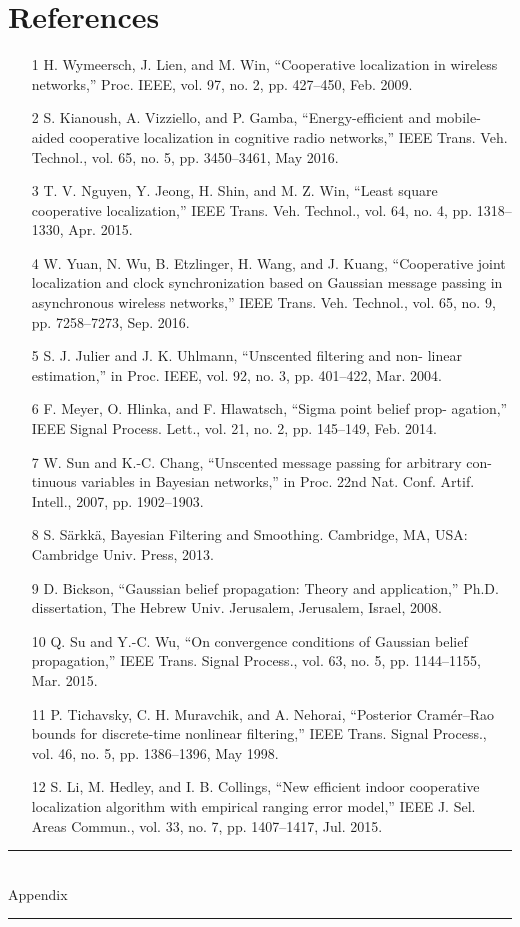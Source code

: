 \documentclass[12pt]{article}
\begin{document}
\section{References}
	\begin{itemize}
		\item[1] H. Wymeersch, J. Lien, and M. Win, “Cooperative localization in wireless
networks,” Proc. IEEE, vol. 97, no. 2, pp. 427–450, Feb. 2009.
		\item[2] S. Kianoush, A. Vizziello, and P. Gamba, “Energy-efficient and mobile-
aided cooperative localization in cognitive radio networks,” IEEE Trans.
Veh. Technol., vol. 65, no. 5, pp. 3450–3461, May 2016.
		\item[3] T. V. Nguyen, Y. Jeong, H. Shin, and M. Z. Win, “Least square cooperative
localization,” IEEE Trans. Veh. Technol., vol. 64, no. 4, pp. 1318–1330,
Apr. 2015.
		\item[4] W. Yuan, N. Wu, B. Etzlinger, H. Wang, and J. Kuang, “Cooperative
joint localization and clock synchronization based on Gaussian message
passing in asynchronous wireless networks,” IEEE Trans. Veh. Technol.,
vol. 65, no. 9, pp. 7258–7273, Sep. 2016.
		\item[5] S. J. Julier and J. K. Uhlmann, “Unscented filtering and non-
linear estimation,” in Proc. IEEE, vol. 92, no. 3, pp. 401–422,
Mar. 2004.
		\item[6] F. Meyer, O. Hlinka, and F. Hlawatsch, “Sigma point belief prop-
agation,” IEEE Signal Process. Lett., vol. 21, no. 2, pp. 145–149,
Feb. 2014.
		\item[7] W. Sun and K.-C. Chang, “Unscented message passing for arbitrary con-
tinuous variables in Bayesian networks,” in Proc. 22nd Nat. Conf. Artif.
Intell., 2007, pp. 1902–1903.
		\item[8] S. Särkkä, Bayesian Filtering and Smoothing. Cambridge, MA, USA:
Cambridge Univ. Press, 2013.

		\item[9] D. Bickson, “Gaussian belief propagation: Theory and application,”
Ph.D. dissertation, The Hebrew Univ. Jerusalem, Jerusalem, Israel,
2008.
		\item[10] Q. Su and Y.-C. Wu, “On convergence conditions of Gaussian belief
propagation,” IEEE Trans. Signal Process., vol. 63, no. 5, pp. 1144–1155,
Mar. 2015.			\item[11] P. Tichavsky, C. H. Muravchik, and A. Nehorai, “Posterior Cramér–Rao
bounds for discrete-time nonlinear filtering,” IEEE Trans. Signal Process.,
vol. 46, no. 5, pp. 1386–1396, May 1998.
		\item[12] S. Li, M. Hedley, and I. B. Collings, “New efficient indoor cooperative
localization algorithm with empirical ranging error model,” IEEE J. Sel.
Areas Commun., vol. 33, no. 7, pp. 1407–1417, Jul. 2015.

	\end{itemize}


\newpage

\begin{titlepage}
	\centering
    \vspace*{8 cm}
	\rule{\linewidth}{0.2 mm} \\[0.4 cm]
	{ \huge  Appendix}\\
	\rule{\linewidth}{0.2 mm} \\[8 cm]


	\vfill

\end{titlepage}
\end{document}
